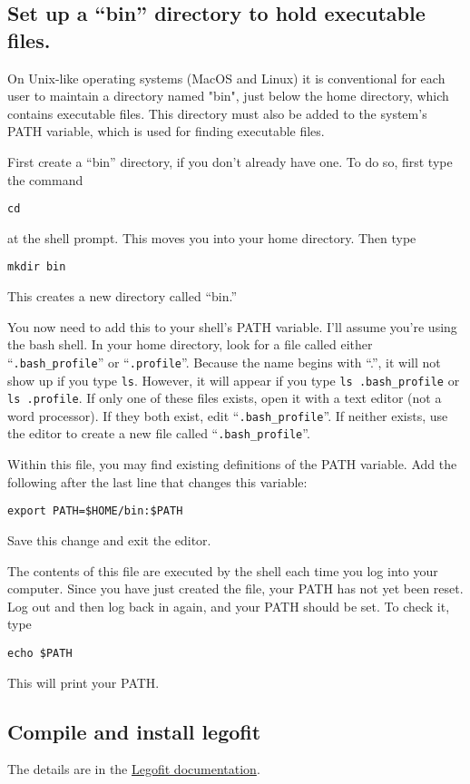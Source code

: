 \documentclass[11pt]{article}
\begin{document}
\subsection{Set up a ``bin'' directory to hold executable files.}
On Unix-like operating systems (MacOS and Linux) it is conventional
for each user to maintain a directory named "bin", just below the home
directory, which contains executable files. This directory must also
be added to the system's PATH variable, which is used for finding
executable files.

First create a ``bin'' directory, if you don't already have one. To do
so, first type the command
\begin{verbatim}
cd
\end{verbatim}
at the shell prompt. This moves you into your home directory. Then
type
\begin{verbatim}
mkdir bin
\end{verbatim}
This creates a new directory called ``bin.''

You now need to add this to your shell's PATH variable. I'll assume
you're using the bash shell. In your home directory, look for a file
called either ``\verb|.bash_profile|'' or
``\texttt{.profile}''. Because the name begins with ``.'', it will not
show up if you type \texttt{ls}. However, it will appear if you type
\verb|ls .bash_profile| or \verb|ls .profile|. If only one of these
files exists, open it with a text editor (not a word processor). If
they both exist, edit ``\verb|.bash_profile|''. If neither exists, use
the editor to create a new file called ``\verb|.bash_profile|''.

Within this file, you may find existing definitions of the PATH
variable. Add the following after the last line that changes this
variable:
\begin{verbatim}
export PATH=$HOME/bin:$PATH
\end{verbatim}
Save this change and exit the editor.

The contents of this file are executed by the shell each time you log
into your computer. Since you have just created the file, your PATH
has not yet been reset. Log out and then log back in again, and your
PATH should be set. To check it, type
\begin{verbatim}
echo $PATH
\end{verbatim}
This will print your PATH.

\subsection{Compile and install legofit}
The details are in the
\href{http://alanrogers.github.io/legofit/html/index.html}{Legofit
  documentation}.
\end{document}
